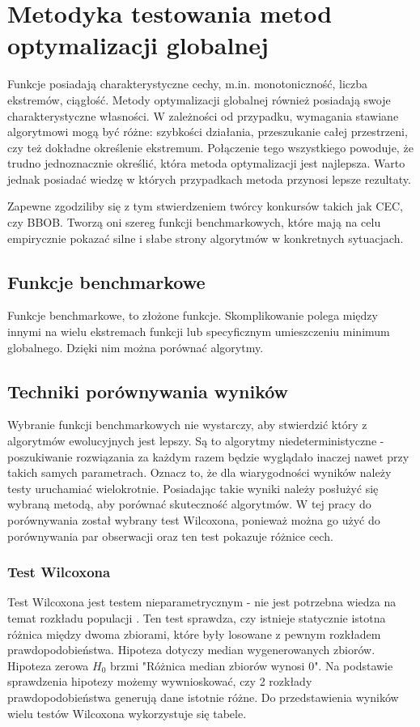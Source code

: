 \documentclass{mini}
\begin{document}
\pagebreak

\section{Metodyka testowania metod optymalizacji globalnej}
Funkcje posiadają charakterystyczne cechy, m.in. monotoniczność, liczba ekstremów, ciągłość. Metody optymalizacji globalnej również posiadają swoje charakterystyczne własności. W zależności od przypadku, wymagania stawiane algorytmowi mogą być różne: szybkości działania, przeszukanie całej przestrzeni, czy też dokładne określenie ekstremum. Połączenie tego wszystkiego powoduje, że trudno jednoznacznie określić, która metoda optymalizacji jest najlepsza. Warto jednak posiadać wiedzę w których przypadkach metoda przynosi lepsze rezultaty.

Zapewne zgodziliby się z tym stwierdzeniem twórcy konkursów takich jak CEC, czy BBOB. Tworzą oni szereg funkcji benchmarkowych, które mają na celu empirycznie pokazać silne i słabe strony algorytmów w konkretnych sytuacjach.

\subsection{Funkcje benchmarkowe}
Funkcje benchmarkowe, to złożone funkcje. Skomplikowanie polega między innymi na wielu ekstremach funkcji lub specyficznym umieszczeniu minimum globalnego. Dzięki nim można porównać algorytmy.

\subsection{Techniki porównywania wyników}
Wybranie funkcji benchmarkowych nie wystarczy, aby stwierdzić który z algorytmów ewolucyjnych jest lepszy. Są to algorytmy niedeterministyczne - poszukiwanie rozwiązania za każdym razem będzie wyglądało inaczej nawet przy takich samych parametrach. Oznacz to, że dla wiarygodności wyników należy testy uruchamiać wielokrotnie. Posiadając takie wyniki należy posłużyć się wybraną metodą, aby porównać skuteczność algorytmów. W tej pracy do porównywania został wybrany test Wilcoxona, ponieważ można go użyć do porównywania par obserwacji oraz ten test pokazuje różnice cech.

\subsubsection*{Test Wilcoxona}
Test Wilcoxona jest testem nieparametrycznym - nie jest potrzebna wiedza na temat rozkładu populacji \cite{wilcox}. Ten test sprawdza, czy istnieje statycznie istotna różnica między dwoma zbiorami, które były losowane z pewnym rozkładem prawdopodobieństwa. Hipoteza dotyczy median wygenerowanych zbiorów. Hipoteza zerowa $H_0$ brzmi "Różnica median zbiorów wynosi 0". Na podstawie sprawdzenia hipotezy możemy wywnioskować, czy 2 rozkłady prawdopodobieństwa generują dane istotnie różne. Do przedstawienia wyników wielu testów Wilcoxona wykorzystuje się tabele.
\end{document}
